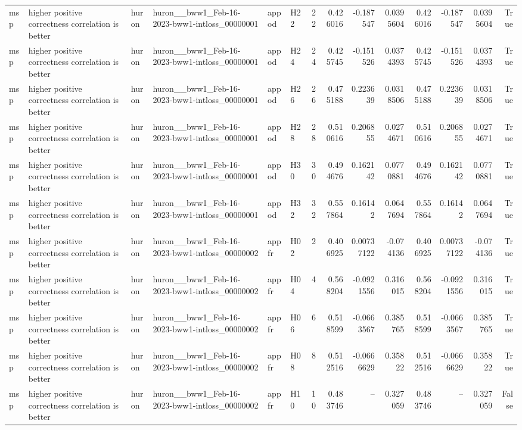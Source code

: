 \begin{longtable}{llllllrrrrrrrr}
msp & higher positive correctness correlation is better & huron & huron\_\_bww1\_Feb-16-2023-bww1-intloss\_00000001 & appod & H22 & 22 & 0.426016 & -0.187547 & 0.0395604 & 0.426016 & -0.187547 & 0.0395604 & True \\
msp & higher positive correctness correlation is better & huron & huron\_\_bww1\_Feb-16-2023-bww1-intloss\_00000001 & appod & H24 & 24 & 0.425745 & -0.151526 & 0.0374393 & 0.425745 & -0.151526 & 0.0374393 & True \\
msp & higher positive correctness correlation is better & huron & huron\_\_bww1\_Feb-16-2023-bww1-intloss\_00000001 & appod & H26 & 26 & 0.475188 & 0.223639 & 0.0318506 & 0.475188 & 0.223639 & 0.0318506 & True \\
msp & higher positive correctness correlation is better & huron & huron\_\_bww1\_Feb-16-2023-bww1-intloss\_00000001 & appod & H28 & 28 & 0.510616 & 0.206855 & 0.0274671 & 0.510616 & 0.206855 & 0.0274671 & True \\
msp & higher positive correctness correlation is better & huron & huron\_\_bww1\_Feb-16-2023-bww1-intloss\_00000001 & appod & H30 & 30 & 0.494676 & 0.162142 & 0.0770881 & 0.494676 & 0.162142 & 0.0770881 & True \\
msp & higher positive correctness correlation is better & huron & huron\_\_bww1\_Feb-16-2023-bww1-intloss\_00000001 & appod & H32 & 32 & 0.557864 & 0.16142 & 0.0647694 & 0.557864 & 0.16142 & 0.0647694 & True \\
msp & higher positive correctness correlation is better & huron & huron\_\_bww1\_Feb-16-2023-bww1-intloss\_00000002 & appfr & H02 & 2 & 0.406925 & 0.00737122 & -0.074136 & 0.406925 & 0.00737122 & -0.074136 & True \\
msp & higher positive correctness correlation is better & huron & huron\_\_bww1\_Feb-16-2023-bww1-intloss\_00000002 & appfr & H04 & 4 & 0.568204 & -0.0921556 & 0.316015 & 0.568204 & -0.0921556 & 0.316015 & True \\
msp & higher positive correctness correlation is better & huron & huron\_\_bww1\_Feb-16-2023-bww1-intloss\_00000002 & appfr & H06 & 6 & 0.518599 & -0.0663567 & 0.385765 & 0.518599 & -0.0663567 & 0.385765 & True \\
msp & higher positive correctness correlation is better & huron & huron\_\_bww1\_Feb-16-2023-bww1-intloss\_00000002 & appfr & H08 & 8 & 0.512516 & -0.0666629 & 0.35822 & 0.512516 & -0.0666629 & 0.35822 & True \\
msp & higher positive correctness correlation is better & huron & huron\_\_bww1\_Feb-16-2023-bww1-intloss\_00000002 & appfr & H10 & 10 & 0.483746 & -- & 0.327059 & 0.483746 & -- & 0.327059 & False \\

\end{longtable}
